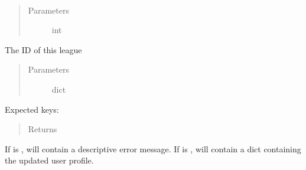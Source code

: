 \documentclass[letterpaper,10pt,english]{sphinxmanual}
\begin{document}
\begin{fulllineitems}
\label{\detokenize{tiger_leagues/models/readme:tiger_leagues.models.league_model.process_join_league_request}}~\begin{quote}\begin{description}
\item[{Parameters}] \leavevmode
{} \textendash{} int

\end{description}\end{quote}

The ID of this league
\begin{quote}\begin{description}
\item[{Parameters}] \leavevmode
{} \textendash{} dict

\end{description}\end{quote}

Expected keys: 
\begin{quote}\begin{description}
\item[{Returns}] \leavevmode
{}

\end{description}\end{quote}

If  is ,  will contain a descriptive error 
message. If  is ,  will contain a 
dict containing the updated user profile.

\end{fulllineitems}

\end{document}
